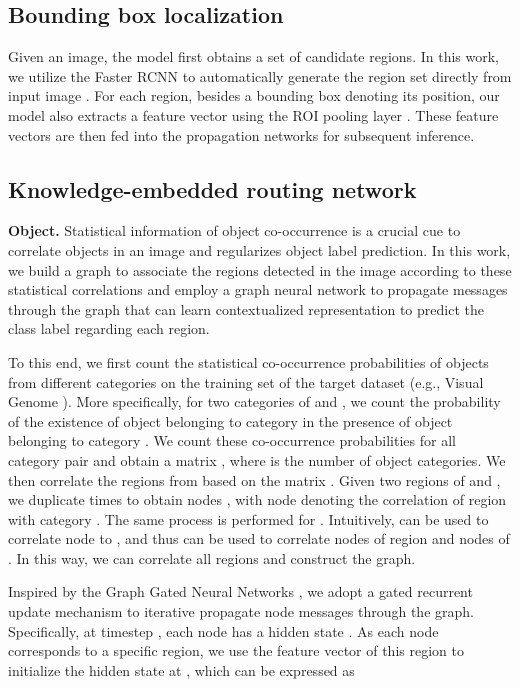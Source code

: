 \documentclass[10pt,twocolumn,letterpaper]{article}
\begin{document}
\subsection{Bounding box localization}
\label{sec:bbl}
Given an image, the model first obtains a set of candidate regions. In this work, we utilize the Faster RCNN \cite{ren2015faster} to automatically generate the region set  directly from input image . For each region, besides a bounding box  denoting its position, our model also extracts a feature vector  using the ROI pooling layer \cite{girshick2015fast}. These feature vectors are then fed into the propagation networks for subsequent inference.


\subsection{Knowledge-embedded routing network}
\label{sec:spn}

\noindent\textbf{Object. }Statistical information of object co-occurrence is a crucial cue to correlate objects in an image and regularizes object label prediction. In this work, we build a graph to associate the regions detected in the image according to these statistical correlations and employ a graph neural network to propagate messages through the graph that can learn contextualized representation to predict the class label regarding each region.

To this end, we first count the statistical co-occurrence probabilities of objects from different categories on the training set of the target dataset (e.g., Visual Genome \cite{krishna2017visual}). More specifically, for two categories of  and , we count the probability  of the existence of object belonging to category  in the presence of object belonging to category . We count these co-occurrence probabilities for all category pair and obtain a matrix , where  is the number of object categories. We then correlate the regions from  based on the matrix . Given two regions of  and , we duplicate   times to obtain  nodes , with node  denoting the correlation of region  with category .  The same process is performed for . Intuitively,  can be used to correlate node  to , and thus  can be used to correlate nodes of region  and nodes of . In this way, we can correlate all regions and construct the graph.

Inspired by the Graph Gated Neural Networks \cite{li2016gated,chen2018knowledge,wang2018deep}, we adopt a gated recurrent update mechanism to iterative propagate node messages through the graph. Specifically, at timestep , each node  has a hidden state . As each node corresponds to a specific region, we use the feature vector of this region to initialize the hidden state at , which can be expressed as
\end{document}

